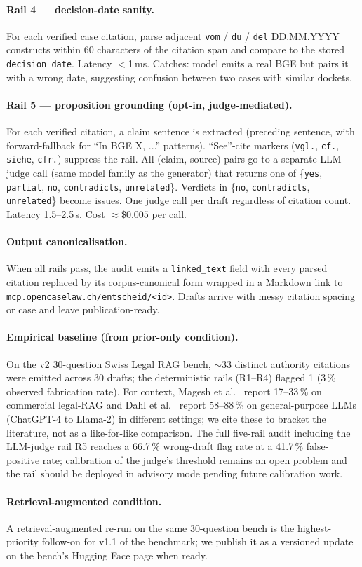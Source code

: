 \paragraph{Rail 4 --- decision-date sanity.}
For each verified case citation, parse adjacent \texttt{vom} / \texttt{du} / \texttt{del} DD.MM.YYYY constructs within 60 characters of the citation span and compare to the stored \texttt{decision\_date}. Latency $<$1\,ms. Catches: model emits a real BGE but pairs it with a wrong date, suggesting confusion between two cases with similar dockets.

\paragraph{Rail 5 --- proposition grounding (opt-in, judge-mediated).}
For each verified citation, a claim sentence is extracted (preceding sentence, with forward-fallback for ``In BGE X, ...'' patterns). ``See''-cite markers (\texttt{vgl.}, \texttt{cf.}, \texttt{siehe}, \texttt{cfr.}) suppress the rail. All (claim, source) pairs go to a separate LLM judge call (same model family as the generator) that returns one of \{\texttt{yes}, \texttt{partial}, \texttt{no}, \texttt{contradicts}, \texttt{unrelated}\}. Verdicts in \{\texttt{no}, \texttt{contradicts}, \texttt{unrelated}\} become issues. One judge call per draft regardless of citation count. Latency 1.5--2.5\,s. Cost $\approx\$0.005$ per call.

\paragraph{Output canonicalisation.}
When all rails pass, the audit emits a \texttt{linked\_text} field with every parsed citation replaced by its corpus-canonical form wrapped in a Markdown link to \texttt{mcp.opencaselaw.ch/entscheid/<id>}. Drafts arrive with messy citation spacing or case and leave publication-ready.

\paragraph{Empirical baseline (from prior-only condition).}
On the v2 30-question Swiss Legal RAG bench, $\sim$33 distinct authority citations were emitted across 30 drafts; the deterministic rails (R1--R4) flagged 1 (3\,\% observed fabrication rate). For context, Magesh et al.~\cite{magesh2024} report 17--33\,\% on commercial legal-RAG and Dahl et al.~\cite{dahl2024} report 58--88\,\% on general-purpose LLMs (ChatGPT-4 to Llama-2) in different settings; we cite these to bracket the literature, not as a like-for-like comparison. The full five-rail audit including the LLM-judge rail R5 reaches a 66.7\,\% wrong-draft flag rate at a 41.7\,\% false-positive rate; calibration of the judge's threshold remains an open problem and the rail should be deployed in advisory mode pending future calibration work.

\paragraph{Retrieval-augmented condition.} A retrieval-augmented re-run on the same 30-question bench is the highest-priority follow-on for v1.1 of the benchmark; we publish it as a versioned update on the bench's Hugging Face page when ready.
